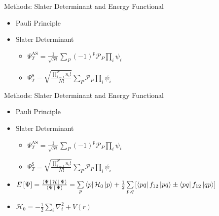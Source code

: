 \documentclass[10pt, t, xcolor=dvipsnames]{beamer}
\begin{document}
\begin{frame}[fragile]{Methods: Slater Determinant and Energy Functional}
    \begin{itemize}
        \item Pauli Principle
        \item Slater Determinant
            \begin{itemize}
                \item $\Psi^{\text{AS}}_T =
                    \frac{1}{\sqrt{N!}}\sum\limits_{P}(-1)^p\mathcal{P}_P\prod\limits_i\psi_i$
                \item $\Psi^{\text{S}}_T =
                    \sqrt{\frac{\prod\limits^N_{i=1}n_i!}{N!}}\sum\limits_{P}\mathcal{P}_P\prod\limits_i\psi_i$
            \end{itemize}
    \end{itemize}
\end{frame}

\begin{frame}[fragile]{Methods: Slater Determinant and Energy Functional}
    \begin{itemize}
        \item Pauli Principle
        \item Slater Determinant
            \begin{itemize}
                \item $\Psi^{\text{AS}}_T =
                    \frac{1}{\sqrt{N!}}\sum\limits_{P}(-1)^p\mathcal{P}_P\prod\limits_i\psi_i$
                \item $\Psi^{\text{S}}_T =
                    \sqrt{\frac{\prod\limits^N_{i=1}n_i!}{N!}}\sum\limits_{P}\mathcal{P}_P\prod\limits_i\psi_i$
            \end{itemize}
        \item $E\left[\Psi\right] =
            \frac{\Braket{\Psi|\mathcal{H}|\Psi}}{\Braket{\Psi|\Psi}} =
            \sum\limits_p\bra{p}\mathcal{H}_0\ket{p} +
            \frac{1}{2}\sum\limits_{p,q}\left[\bra{pq}f_{12}\ket{pq} \pm
            \bra{pq}f_{12}\ket{qp}\right]$
        \item $\mathcal{H}_0 = -\frac{1}{2}\sum\limits_i\nabla^2_i + V(r)$
    \end{itemize}
\end{frame}
\end{document}
